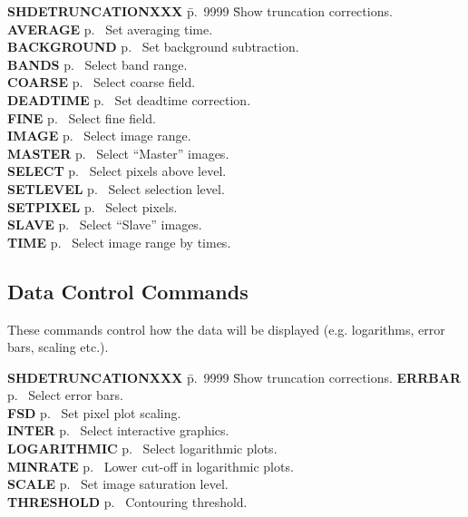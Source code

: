 \begin{tabbing}
{\bf SHDETRUNCATIONXXX} \= p.~9999 \= Show truncation corrections.\kill
{\bf AVERAGE} \> p.~\pageref{av} \> Set averaging time.\\ 
{\bf BACKGROUND} \> p.~\pageref{bac} \> Set background subtraction.\\ 
{\bf BANDS} \> p.~\pageref{ban} \> Select band range.\\ 
{\bf COARSE} \> p.~\pageref{coa} \> Select coarse field.\\ 
{\bf DEADTIME} \> p.~\pageref{dea} \> Set deadtime correction.\\ 
{\bf FINE} \> p.~\pageref{fin} \> Select fine field.\\ 
{\bf IMAGE} \> p.~\pageref{im} \> Select image range.\\ 
{\bf MASTER} \> p.~\pageref{mas} \> Select ``Master'' images.\\ 
{\bf SELECT} \> p.~\pageref{sel} \> Select pixels above level.\\ 
{\bf SETLEVEL} \> p.~\pageref{setl} \> Select selection level.\\ 
{\bf SETPIXEL} \> p.~\pageref{setp} \> Select pixels.\\ 
{\bf SLAVE} \> p.~\pageref{sl} \> Select ``Slave'' images.\\ 
{\bf TIME} \> p.~\pageref{ti} \> Select image range by times.\\
\end{tabbing}

\subsection{Data Control Commands}

These commands control how the data will be displayed (e.g. logarithms,
error bars, scaling etc.).

\begin{tabbing}
{\bf SHDETRUNCATIONXXX} \= p.~9999 \= Show truncation corrections.\kill
{\bf ERRBAR} \> p.~\pageref{er} \> Select error bars.\\ 
{\bf FSD} \> p.~\pageref{fsd} \> Set pixel plot scaling.\\ 
{\bf INTER} \> p.~\pageref{int} \> Select interactive graphics.\\ 
{\bf LOGARITHMIC} \> p.~\pageref{lo} \> Select logarithmic plots.\\ 
{\bf MINRATE} \> p.~\pageref{mi} \> Lower cut-off in logarithmic
plots.\\ 
{\bf SCALE} \> p.~\pageref{sc} \> Set image saturation level.\\ 
{\bf THRESHOLD} \> p.~\pageref{th} \> Contouring threshold.\\
\end{tabbing}


